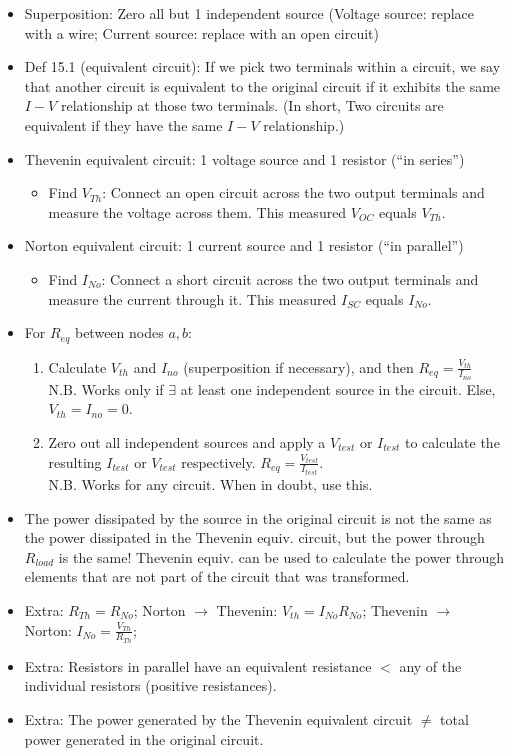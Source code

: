 \documentclass{article}
\begin{document}
\pagebreak
{}
\begin{itemize}
	\item Superposition: Zero all but 1 independent source (Voltage source: replace with a wire; Current source: replace with an open circuit)
	\item Def 15.1 (equivalent circuit): If we pick two terminals within a circuit, we say that another circuit is equivalent to the original circuit if it exhibits the same $I-V$ relationship at those two terminals. (In short, Two circuits are equivalent if they have the same $I-V$ relationship.)
	\item Thevenin equivalent circuit: 1 voltage source and 1 resistor (``in series'')
	\begin{itemize}
		\item Find $V_{Th}$: Connect an open circuit across the two output terminals and measure the voltage across them. This measured $V_{OC}$ equals $V_{Th}$.
	\end{itemize}
	\item Norton equivalent circuit: 1 current source and 1 resistor (``in parallel'')
	\begin{itemize}
		\item Find $I_{No}$: Connect a short circuit across the two output terminals and measure the current through it. This measured $I_{SC}$ equals $I_{No}$.
	\end{itemize}
	\item For $R_{eq}$ between nodes $a,b$:
	\begin{enumerate}
		\item Calculate $V_{th}$ and $I_{no}$ (superposition if necessary), and then $R_{eq} = \frac{V_{th}}{I_{no}}$ \\
		{\color{blue} N.B.} Works only if $\exists$ at least one independent source in the circuit. Else, $V_{th} = I_{no} = 0$.
		\item Zero out {\color{red} all} independent sources and apply a $V_{test}$ or $I_{test}$ to calculate the resulting $I_{test}$ or $V_{test}$ respectively. $R_{eq} = \frac{V_{test}}{I_{test}}$. \\
		{\color{blue} N.B.} Works for any circuit. When in doubt, use this.
	\end{enumerate}
	\item The power dissipated by the source in the original circuit is not the same as the power dissipated in the Thevenin equiv. circuit, but the power through $R_{load}$ is the same! Thevenin equiv. can be used to calculate the power through elements that are not part of the circuit that was transformed.
	\item Extra: {\color{red} $R_{Th} = R_{No}$}; Norton $\rightarrow$ Thevenin: $V_{th} = I_{No}R_{No}$; Thevenin $\rightarrow$ Norton: $I_{No} = \frac{V_{Th}}{R_{Th}}$;
	\item Extra: Resistors in parallel have an equivalent resistance $<$ any of the individual resistors (positive resistances).
	\item Extra: The power generated by the Thevenin equivalent circuit $\neq$ total power generated in the original circuit.
\end{itemize}
\end{document}
